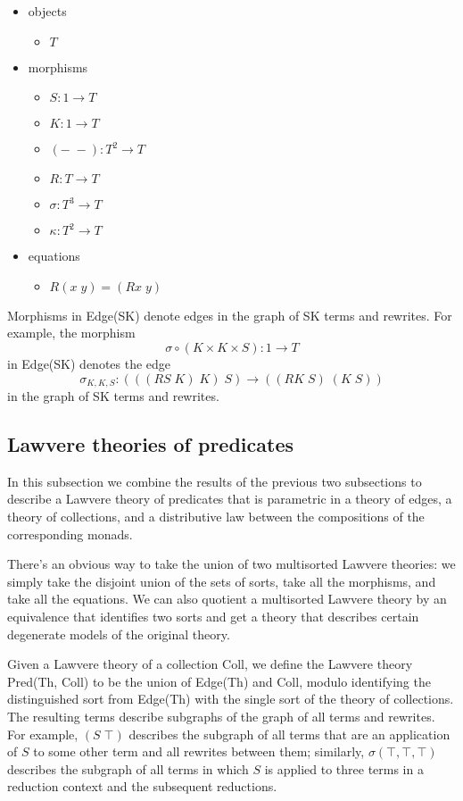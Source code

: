 \documentclass[submission,copyright,creativecommons]{eptcs}
\newcommand{\maps}{\colon}
\begin{document}
\begin{itemize}
  \item objects
    \begin{itemize}
      \item $T$
    \end{itemize}
  \item morphisms
    \begin{itemize}
      \item $S\maps 1 \to T$
      \item $K\maps 1 \to T$
      \item $(-\; -)\maps T^2 \to T$
      \item $R\maps T \to T$
      \item $\sigma\maps T^3 \to T$
      \item $\kappa\maps T^2 \to T$
    \end{itemize}
  \item equations
    \begin{itemize}
      \item $R(x\; y) = (Rx\; y)$
    \end{itemize}
\end{itemize}

Morphisms in Edge(SK) denote edges in the graph of SK terms and rewrites.  For example, the morphism 
\[\sigma \circ (K \times K \times S)\maps 1 \to T\]
in Edge(SK) denotes the edge
\[\sigma_{K,K,S}\maps (((RS\; K)\; K)\; S) \to ((RK\; S)\; (K\; S))\]
in the graph of SK terms and rewrites.

\subsection{Lawvere theories of predicates}

In this subsection we combine the results of the previous two subsections to describe a Lawvere theory of predicates that is parametric in a theory of edges, a theory of collections, and a distributive law between the compositions of the corresponding monads.  

There's an obvious way to take the union of two multisorted Lawvere theories: we simply take the disjoint union of the sets of sorts, take all the morphisms, and take all the equations.  We can also quotient a multisorted Lawvere theory by an equivalence that identifies two sorts and get a theory that describes certain degenerate models of the original theory.

Given a Lawvere theory of a collection Coll, we define the Lawvere theory Pred(Th, Coll) to be the union of Edge(Th) and Coll, modulo identifying the distinguished sort from Edge(Th) with the single sort of the theory of collections.  The resulting terms describe subgraphs of the graph of all terms and rewrites.  For example, $(S\; \top)$ describes the subgraph of all terms that are an application of $S$ to some other term and all rewrites between them; similarly, $\sigma(\top, \top, \top)$ describes the subgraph of all terms in which $S$ is applied to three terms in a reduction context and the subsequent reductions.
\end{document}
